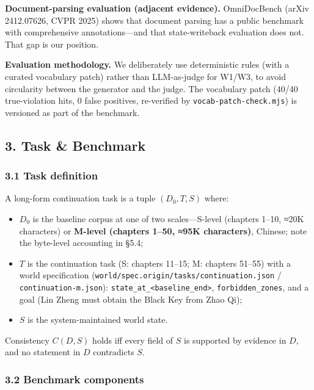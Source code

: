\documentclass[
  english,
]{article}
\providecommand{\tightlist}{%
  \setlength{\itemsep}{0pt}\setlength{\parskip}{0pt}}
\begin{document}
\textbf{Document-parsing evaluation (adjacent evidence).} OmniDocBench
(arXiv 2412.07626, CVPR 2025) shows that document parsing has a public
benchmark with comprehensive annotations---and that state-writeback
evaluation does not. That gap is our position.

\textbf{Evaluation methodology.} We deliberately use deterministic rules
(with a curated vocabulary patch) rather than LLM-as-judge for W1/W3, to
avoid circularity between the generator and the judge. The vocabulary
patch (40/40 true-violation hits, 0 false positives, re-verified by
\texttt{vocab-patch-check.mjs}) is versioned as part of the benchmark.

\subsection{3. Task \& Benchmark}\label{task-benchmark}

\subsubsection{3.1 Task definition}\label{task-definition}

A long-form continuation task is a tuple \((D_0, T, S)\) where:

\begin{itemize}
\tightlist
\item
  \(D_0\) is the baseline corpus at one of two scales---S-level
  (chapters 1--10, ≈20K characters) or \textbf{M-level (chapters 1--50,
  ≈95K characters)}, Chinese; note the byte-level accounting in §5.4;
\item
  \(T\) is the continuation task (S: chapters 11--15; M: chapters
  51--55) with a world specification
  (\texttt{world/spec.origin/tasks/continuation.json} /
  \texttt{continuation-m.json}):
  \texttt{state\_at\_\textless{}baseline\_end\textgreater{}},
  \texttt{forbidden\_zones}, and a goal (Lin Zheng must obtain the Black
  Key from Zhao Qi);
\item
  \(S\) is the system-maintained world state.
\end{itemize}

Consistency \(C(D, S)\) holds iff every field of \(S\) is supported by
evidence in \(D\), and no statement in \(D\) contradicts \(S\).

\subsubsection{3.2 Benchmark components}\label{benchmark-components}
\end{document}
